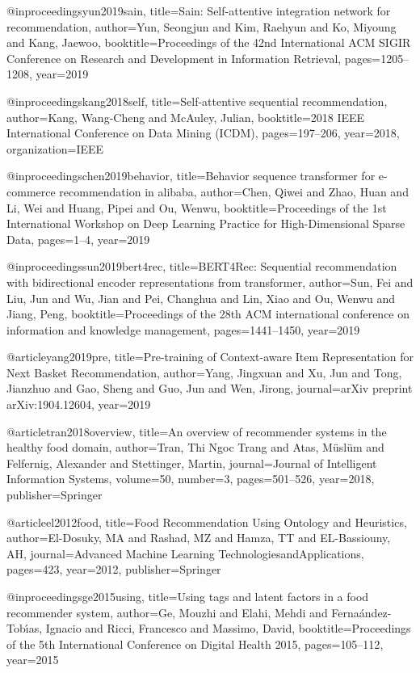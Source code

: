 @inproceedings{yun2019sain,
  title={Sain: Self-attentive integration network for recommendation},
  author={Yun, Seongjun and Kim, Raehyun and Ko, Miyoung and Kang, Jaewoo},
  booktitle={Proceedings of the 42nd International ACM SIGIR Conference on Research and Development in Information Retrieval},
  pages={1205--1208},
  year={2019}
}

@inproceedings{kang2018self,
  title={Self-attentive sequential recommendation},
  author={Kang, Wang-Cheng and McAuley, Julian},
  booktitle={2018 IEEE International Conference on Data Mining (ICDM)},
  pages={197--206},
  year={2018},
  organization={IEEE}
}

@inproceedings{chen2019behavior,
  title={Behavior sequence transformer for e-commerce recommendation in alibaba},
  author={Chen, Qiwei and Zhao, Huan and Li, Wei and Huang, Pipei and Ou, Wenwu},
  booktitle={Proceedings of the 1st International Workshop on Deep Learning Practice for High-Dimensional Sparse Data},
  pages={1--4},
  year={2019}
}

@inproceedings{sun2019bert4rec,
  title={BERT4Rec: Sequential recommendation with bidirectional encoder representations from transformer},
  author={Sun, Fei and Liu, Jun and Wu, Jian and Pei, Changhua and Lin, Xiao and Ou, Wenwu and Jiang, Peng},
  booktitle={Proceedings of the 28th ACM international conference on information and knowledge management},
  pages={1441--1450},
  year={2019}
}

@article{yang2019pre,
  title={Pre-training of Context-aware Item Representation for Next Basket Recommendation},
  author={Yang, Jingxuan and Xu, Jun and Tong, Jianzhuo and Gao, Sheng and Guo, Jun and Wen, Jirong},
  journal={arXiv preprint arXiv:1904.12604},
  year={2019}
}

@article{tran2018overview,
  title={An overview of recommender systems in the healthy food domain},
  author={Tran, Thi Ngoc Trang and Atas, M{\"u}sl{\"u}m and Felfernig, Alexander and Stettinger, Martin},
  journal={Journal of Intelligent Information Systems},
  volume={50},
  number={3},
  pages={501--526},
  year={2018},
  publisher={Springer}
}

@article{el2012food,
  title={Food Recommendation Using Ontology and Heuristics},
  author={El-Dosuky, MA and Rashad, MZ and Hamza, TT and EL-Bassiouny, AH},
  journal={Advanced Machine Learning TechnologiesandApplications},
  pages={423},
  year={2012},
  publisher={Springer}
}

@inproceedings{ge2015using,
  title={Using tags and latent factors in a food recommender system},
  author={Ge, Mouzhi and Elahi, Mehdi and Ferna{\'a}ndez-Tob{\'\i}as, Ignacio and Ricci, Francesco and Massimo, David},
  booktitle={Proceedings of the 5th International Conference on Digital Health 2015},
  pages={105--112},
  year={2015}
}

